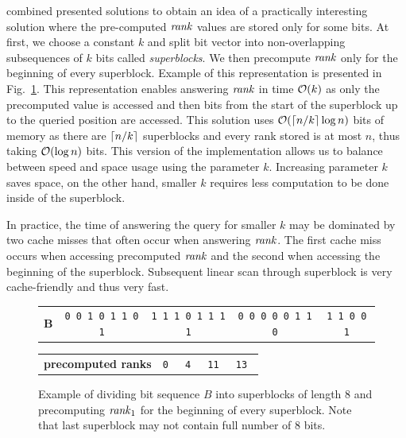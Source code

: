 \cite{gonzalez2005practical} combined presented solutions to obtain an idea of a practically
interesting solution where the pre-computed $\mathit{rank}$ values are stored only for some
bits. At first, we choose a constant $k$ and split bit vector into non-overlapping
subsequences of $k$ bits called \textit{superblocks}. We then precompute $\mathit{rank}$ only for
the beginning of every superblock. Example of this representation is presented in
Fig.~\ref{obr:practicalRank}. This representation enables answering $\mathit{rank}$ in time
$\mathcal{O}(k)$ as only the precomputed value is accessed and then bits from the start of the
superblock up to the queried position are accessed. This solution uses $\mathcal{O}(\left\lceil n/k \right\rceil\log n)$
bits of memory as there are $\left\lceil n/k \right\rceil$ superblocks and every rank stored is at most $n$,
thus taking $\mathcal{O}(\log n)$ bits. This version of the implementation allows us to balance between
speed and space usage using the parameter $k$. Increasing parameter $k$ saves space, on the other
hand, smaller $k$ requires less computation to be done inside of the superblock.

In practice, the time of answering the query for smaller $k$ may be dominated by two cache misses
that often occur when answering $\mathit{rank}$. The first cache miss occurs when accessing precomputed
$\mathit{rank}$ and the second when accessing the beginning of the superblock. Subsequent linear scan
through superblock is very cache-friendly and thus very fast.


\begin{figure}
	\begin{tabular}{c|c|c|c|c|}
	\cline{2-5}
	\textbf{B} & {\tt 0 0 1 0 1 1 0 1} & {\tt 1 1 1 0 1 1 1 1} & {\tt 0 0 0 0 0 1 1 0} & {\tt 1 1 0 0 1} \\ \cline{2-5}
	\end{tabular}

    \bigskip

    \begin{tabular}{c|c|c|c|c|}
        \cline{2-5}
        \textbf{precomputed ranks} & \tt 0 & \tt 4 & \tt 11 & \tt 13 \\ \cline{2-5}
        \end{tabular}

	\caption[TODO]{Example of dividing bit sequence $B$ into superblocks of length 8 and precomputing
    $\mathit{rank}_1$ for the beginning of every superblock. Note that last superblock may not contain full
    number of 8 bits.}
	\label{obr:practicalRank}
\end{figure}

